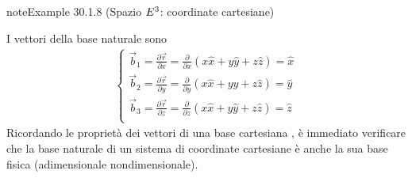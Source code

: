 \documentclass[letterpaper,10pt,italian]{jupyterBook}
\begin{document}
\begin{sphinxadmonition}{note}{Example 30.1.8 (Spazio \protect\(E^3\protect\): coordinate cartesiane)}



\sphinxAtStartPar
I vettori della base naturale sono
\begin{equation*}
\begin{split}\begin{cases}
  \vec{b}_1 = \frac{\partial \vec{r}}{\partial x} = \frac{\partial }{\partial x} \left( x \hat{x} + y \hat{y} + z \hat{z} \right) = \hat{x} \\
  \vec{b}_2 = \frac{\partial \vec{r}}{\partial y} = \frac{\partial }{\partial y} \left( x \hat{x} + y \hat{y} + z \hat{z} \right) = \hat{y} \\
  \vec{b}_3 = \frac{\partial \vec{r}}{\partial z} = \frac{\partial }{\partial z} \left( x \hat{x} + y \hat{y} + z \hat{z} \right) = \hat{z} \\
\end{cases}\end{split}
\end{equation*}
\sphinxAtStartPar
Ricordando le proprietà dei vettori di una base cartesiana  , è immediato verificare che la base naturale di un sistema di coordinate cartesiane è anche la sua base fisica (adimensionale non\sphinxhyphen{}dimensionale).
\end{sphinxadmonition}
\label{ch/vector-calculus/geometry:def-cylindrical-coords-e3-base}
\end{document}
